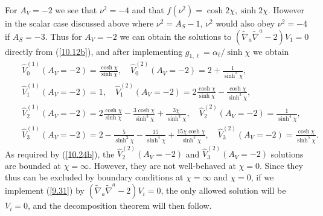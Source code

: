 \documentclass[aps,onecolumn,10pt]{revtex4}
\numberwithin{equation}{section}
\numberwithin{equation}{section}
\begin{document}
For $A_V=-2$ we see that $\nu^2=-4$ and that $f(\nu^2)=\cosh 2\chi,\sinh 2\chi$. However in the scalar case discussed above where $\nu^2=A_S-1$, $\nu^2$ would also obey $\nu^2=-4$ if $A_S=-3$. Thus for $A_V=-2$ we can obtain the solutions to $(\tilde{\nabla}_a\tilde{\nabla}^a-2)V_1=0$ directly from (\ref{10.12b}), and after implementing $g_{1,\ell}=\alpha_{\ell}/\sinh\chi$ we  obtain 
%
\begin{eqnarray}
&&\hat{V}^{(1)}_0(A_V=-2)=\frac{\cosh\chi}{\sinh\chi},\quad \hat{V}^{(2)}_0(A_V=-2)=2+\frac{1}{\sinh^2\chi},
\nonumber\\
&&\hat{V}^{(1)}_1(A_V=-2)=1,\quad \hat{V}^{(2)}_1(A_V=-2)=2\frac{\cosh\chi}{\sinh\chi}-\frac{\cosh\chi}{\sinh^3\chi},
\nonumber\\
&&\hat{V}^{(1)}_2(A_V=-2)=2\frac{\cosh\chi}{\sinh\chi}-\frac{3\cosh\chi}{\sinh^3\chi}+\frac{3\chi}{\sinh^4\chi},\quad \hat{V}^{(2)}_2(A_V=-2)=\frac{1}{\sinh^4\chi},
\nonumber\\
&&\hat{V}^{(1)}_3(A_V=-2)=2-\frac{5}{\sinh^2\chi}-\frac{15}{\sinh^4\chi}+\frac{15\chi\cosh\chi}{\sinh^5\chi},\quad \hat{V}^{(2)}_3(A_V=-2)=\frac{\cosh\chi}{\sinh^5\chi}.
\label{10.29b}
\end{eqnarray}
%
As required by (\ref{10.24b}), the $\hat{V}^{(2)}_2(A_V=-2)$ and $\hat{V}^{(2)}_3(A_V=-2)$ solutions  are bounded at  $\chi=\infty$. However, they are not well-behaved at $\chi=0$. Since they thus can  be excluded by boundary conditions at $\chi=\infty$ and $\chi=0$, if we implement (\ref{9.31}) by $(\tilde{\nabla}_a\tilde{\nabla}^a-2)V_i=0$,  the only allowed solution will be $V_i=0$, and the decomposition theorem will then follow.
\end{document}
